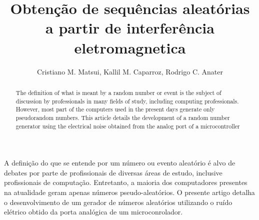\documentclass[
12pt,				%
openright,			%
twoside,			%
a4paper,			%
sumario=tradicional, %
hidelinks,          %
num,				%
bibjustif,			%
brackets,			%
english,			%
brazil				%
]{article}       %
\title{Obtenção de sequências aleatórias a partir de interferência eletromagnetica}
\author{Cristiano M. Matsui\inst{1}, Kallil M. Caparroz\inst{2}, Rodrigo C. Anater\inst{3} }
\begin{document}
 

\maketitle

\begin{abstract} 	
 	The definition of what is meant by a random number or event is the subject of discussion by professionals in many fields of study, including computing professionals. However, most part of the computers used in the present days generate only pseudorandom numbers. This article details the development of a random number generator using the electrical noise obtained from the analog port of a microcontroller
\end{abstract}
     
\begin{resumo} 
 	A definição do que se entende por um número ou evento aleatório é alvo de debates por parte de profissionais de diversas áreas de estudo, inclusive profissionais de computação. Entretanto, a maioria dos computadores presentes na atualidade geram apenas números pseudo-aleatórios. O presente artigo detalha o desenvolvimento de um gerador de números aleatórios utilizando o ruído elétrico obtido da porta analógica de um microconrolador.  
\end{resumo}








\end{document}
